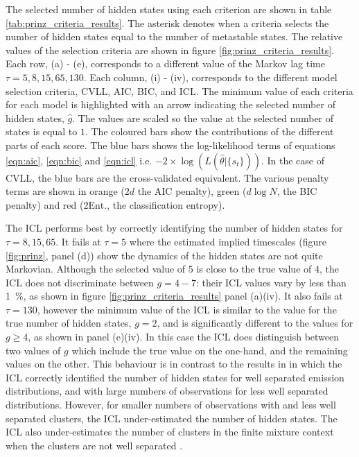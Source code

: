 The selected number of hidden states using each criterion are shown in table \ref{tab:prinz_criteria_results}. The asterisk denotes when a criteria selects the number of hidden states equal to the number of metastable states. The relative values of the selection criteria are shown in figure \ref{fig:prinz_criteria_results}. Each row, (a) - (e), corresponds to a different value of the Markov lag time $\tau=5, 8, 15, 65, 130$. Each column, (i) - (iv), corresponds to the different model selection criteria, CVLL, AIC, BIC, and ICL. The minimum value of each criteria for each model is highlighted with an arrow indicating the selected number of hidden states, $\hat{g}$. The values are scaled so the value at the selected number of states is equal to $1$.  The coloured bars show the contributions of the different parts of each score. The blue bars shows the log-likelihood terms of equations \ref{eqn:aic}, \ref{eqn:bic} and \ref{eqn:icl} i.e.  $-2\times \log{\left(L(\hat{\theta}|\{s_t\})\right)}$. In the case of CVLL, the blue bars are the  cross-validated equivalent. The various penalty terms are shown in orange ($2d$ the AIC penalty), green ($d\log{N}$, the BIC penalty) and red ($2\mathrm{Ent.}$, the classification entropy). 

The ICL performs best by correctly identifying the number of hidden states for $\tau=8, 15, 65$. It fails at $\tau=5$ where the estimated implied timescales (figure \ref{fig:prinz}, panel (d)) show the dynamics of the hidden states are not quite Markovian. Although the selected value of $5$ is close to the true value of $4$, the ICL does not discriminate between $g=4 - 7$: their ICL values vary by less than \SI{1}{\percent}, as shown in figure \ref{fig:prinz_criteria_results} panel (a)(iv). It also fails at $\tau=130$, however the minimum value of the ICL is similar to the value for the true number of hidden states, $g = 2$, and is significantly different to the values for $g \ge 4$,  as shown in panel (e)(iv). In this case the ICL does distinguish between two  values of $g$ which include the true value on the one-hand, and the remaining values on the other. This behaviour is in contrast to the results in \cite{celeuxSelectingHiddenMarkov2008} in which the ICL correctly identified the number of hidden states for well separated emission distributions, and with large numbers of observations for less well separated distributions. However, for smaller numbers of observations with and less well separated clusters, the ICL under-estimated the number of hidden states. The ICL also under-estimates the number of clusters in the finite mixture context when the clusters are not well separated \cite{biernackiAssessingMixtureModel2000a}. 

